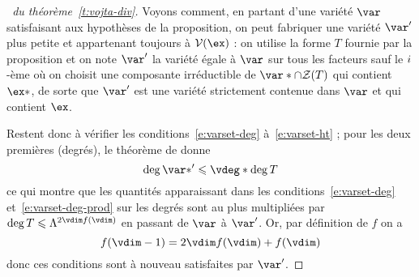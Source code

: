 \begin{proof}[\proofname\ du théorème~\ref{t:vojta-div}]
  Voyons comment, en partant d'une variété \( \var \) satisfaisant aux
  hypothèses de la proposition, on peut fabriquer une variété \( \var' \) plus
  petite et appartenant toujours à \( \varset(\ex) \) : on utilise la forme
  \( T \) fournie par la proposition et on note
  \( \var' \) la variété égale à \( \var \) sur tous les facteurs sauf le \(
    i \)-ème où on choisit une composante irréductible de
  \( \var* \cap \zeros T \) qui contient \( \ex* \), de sorte que \( \var' \)
  est une variété strictement contenue dans \( \var \) et qui contient \( \ex
  \).

  Restent donc à vérifier les conditions~\eqref{e:varset-deg}
  à~\eqref{e:varset-ht} ; pour les deux premières (degrés), le théorème de
   donne
  \begin{equation}
    \deg \var*' \le \vdeg* \deg T
  \end{equation}
  ce qui montre que les quantités apparaissant dans les
  conditions~\eqref{e:varset-deg} et~\eqref{e:varset-deg-prod} sur les degrés
  sont au plus multipliées par \( \deg T \le \Lambda^{2\vdim f(\vdim)} \) en
  passant de \( \var \) à \( \var' \). Or, par définition de \( f \) on a
  \begin{equation} \label{e:ct-f}
    f(\vdim-1) = 2\vdim f(\vdim) + f(\vdim)
  \end{equation}
  donc ces conditions sont à nouveau satisfaites par \( \var' \).


\end{proof}
